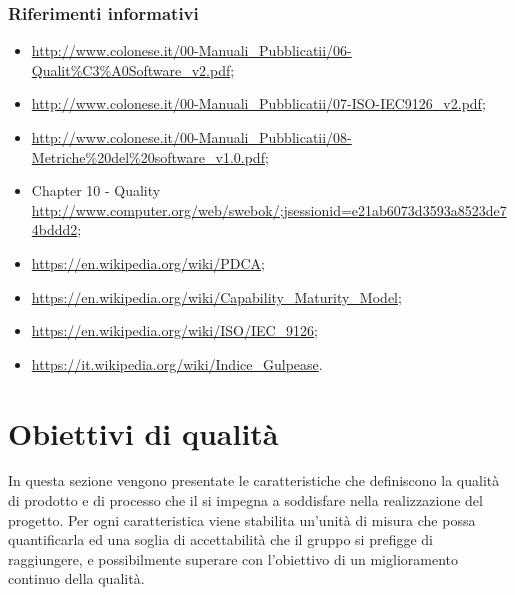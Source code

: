 \documentclass[a4paper, titlepage]{article}
\begin{document}
\subsubsection{Riferimenti informativi}
\label{rifinfo}
\begin{itemize}
\item {}
	\newline \url{http://www.colonese.it/00-Manuali_Pubblicatii/06-Qualit%C3%A0Software_v2.pdf};
\item {} 
	\newline \url{http://www.colonese.it/00-Manuali_Pubblicatii/07-ISO-IEC9126_v2.pdf};
\item {}
	\newline \url{http://www.colonese.it/00-Manuali_Pubblicatii/08-Metriche%20del%20software_v1.0.pdf};
\item {} Chapter 10 -  Quality
	\newline \url{http://www.computer.org/web/swebok/;jsessionid=e21ab6073d3593a8523de74bddd2};
\item {}
	\newline \url{https://en.wikipedia.org/wiki/PDCA};
\item {}
	\newline \url{https://en.wikipedia.org/wiki/Capability_Maturity_Model};
\item {}
	\newline \url{https://en.wikipedia.org/wiki/ISO/IEC_9126};
\item {}
	\newline \url{https://it.wikipedia.org/wiki/Indice_Gulpease}.
\end{itemize}

\newpage
\section{Obiettivi di qualità}
In questa sezione vengono presentate le caratteristiche che definiscono la qualità di prodotto e di processo che il  si impegna a soddisfare nella realizzazione del progetto. 
\newline Per ogni caratteristica viene stabilita un'unità di misura che possa quantificarla ed una soglia di accettabilità che il gruppo si prefigge di raggiungere, e possibilmente superare con l'obiettivo di un miglioramento continuo della qualità.
\end{document}
